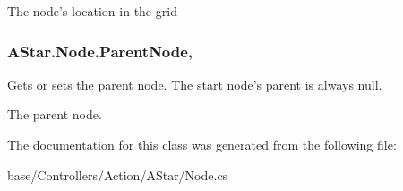 The node's location in the grid 

\hypertarget{classAStar_1_1Node_af01de677cce55f979bab4ce6577c9614}{
\subsubsection[{Parent\-Node}]{ A\-Star.\-Node.\-Parent\-Node\hspace{0.3cm}{\ttfamily [get]}, {\ttfamily [set]}}}\label{classAStar_1_1Node_af01de677cce55f979bab4ce6577c9614}


Gets or sets the parent node. The start node's parent is always null. 

The parent node.

The documentation for this class was generated from the following file\-:\begin{DoxyCompactItemize}
\item 
base/\-Controllers/\-Action/\-A\-Star/Node.\-cs\end{DoxyCompactItemize}
